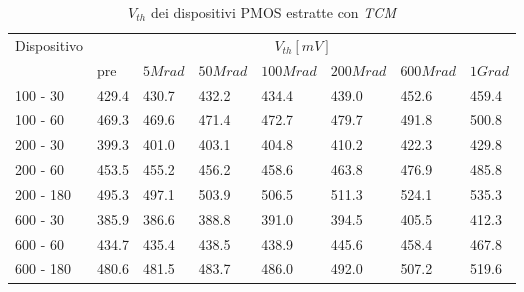\documentclass[12pt, letterpaper]{book}
\begin{document}
\begin{table}[H]
  \renewcommand{\arraystretch}{1.3}
    \begin{tabular}{m{2cm} m{0.8cm} m{1.1cm} m{1.3cm} m{1.5cm} m{1.5cm} m{1.5cm} m{1cm}}
      \toprule
      \multirow{2}{*}{Dispositivo} & \multicolumn{7}{c}{$V_{th} [mV] $}                                                                    \\
      \cmidrule{2-8}
                                   & pre                               & $5Mrad$ & $50Mrad$ & $100Mrad$ & $200Mrad$ & $600Mrad$ & $1Grad$ \\
      \midrule
      100 - 30               	& 429.4                             & 430.7   & 432.2    & 434.4     & 439.0     & 452.6     & 459.4   \\
      \hline
      100 - 60                 	& 469.3                             & 469.6   & 471.4    & 472.7     & 479.7     & 491.8     & 500.8   \\
      \hline
      200 - 30                  	& 399.3                             & 401.0   & 403.1    & 404.8     & 410.2     & 422.3     & 429.8   \\
      \hline
      200 - 60                    & 453.5                             & 455.2   & 456.2    & 458.6     & 463.8     & 476.9     & 485.8   \\
      \hline
      200 - 180 			& 495.3                             & 497.1   & 503.9    & 506.5     & 511.3     & 524.1     & 535.3   \\
      \hline
      600 - 30                  	& 385.9                             & 386.6   & 388.8    & 391.0     & 394.5     & 405.5     & 412.3   \\
      \hline
      600 - 60                    & 434.7                             & 435.4   & 438.5    & 438.9     & 445.6     & 458.4     & 467.8   \\
      \hline
      600 - 180              	& 480.6                             & 481.5   & 483.7    & 486.0     & 492.0     & 507.2     & 519.6   \\
      \bottomrule
    \end{tabular}
  \caption{$V_{th}$ dei dispositivi PMOS estratte con \emph{TCM}}
  \label{tab:VthTCMP}
\end{table}
\end{document}
